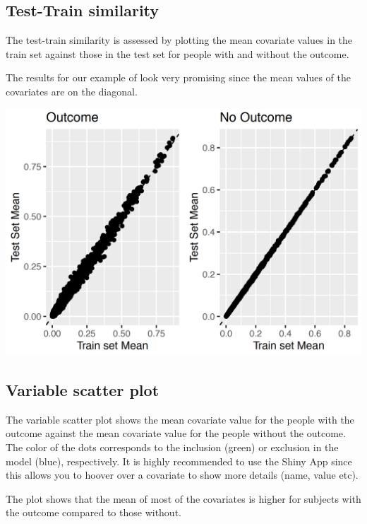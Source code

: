 \documentclass[]{book}
\begin{document}
\newpage

\subsection{Test-Train similarity}\label{test-train-similarity}

The test-train similarity is assessed by plotting the mean covariate
values in the train set against those in the test set for people with
and without the outcome.

The results for our example of look very promising since the mean values
of the covariates are on the diagonal.

\includegraphics[width=1\linewidth]{images/PatientLevelPrediction/generalizability}

\newpage

\subsection{Variable scatter plot}\label{variable-scatter-plot}

The variable scatter plot shows the mean covariate value for the people
with the outcome against the mean covariate value for the people without
the outcome. The color of the dots corresponds to the inclusion (green)
or exclusion in the model (blue), respectively. It is highly recommended
to use the Shiny App since this allows you to hoover over a covariate to
show more details (name, value etc).

The plot shows that the mean of most of the covariates is higher for
subjects with the outcome compared to those without.
\end{document}
